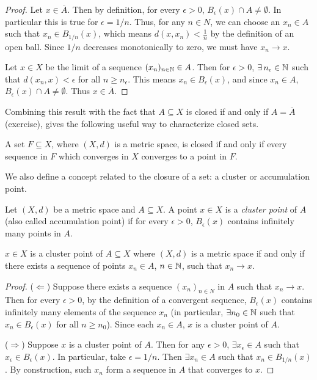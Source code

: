 \documentclass{article}
\begin{document}
\begin{proof}
Let $x \in \overline A$. Then by definition, for every $\epsilon > 0$, $B_\epsilon(x) \cap A \neq \emptyset$. In particular this is true for $\epsilon = 1/n$. Thus, for any $n \in N$, we can choose an $x_n \in A$ such that $x_n \in B_{1/n}(x)$, which means $d(x,x_n) < \frac{1}{n}$ by the definition of an open ball. Since $1/n$ decreases monotonically to zero, we must have $x_n \to x$.

Let $x \in X$ be the limit of a sequence $(x_n)_{n \in {\mathbb{N}}} \in A$. Then for $\epsilon > 0$, $\exists \, n_\epsilon \in {\mathbb{N}}$ such that $d(x_n,x) < \epsilon$ for all $n \geq n_\epsilon$. This means $x_n \in B_\epsilon(x)$, and since $x_n \in A$, $B_\epsilon(x) \cap A \neq \emptyset$. Thus $x \in \overline A$.
\end{proof}

Combining this result with the fact that $A \subseteq X$ is closed if and only if $A = \overline A$ (exercise), gives the following useful way to characterize closed sets. 

\begin{corollary}
\label{cor:closed_converge}
A set $F \subseteq X$, where $(X, d)$ is a metric space, is closed if and only if every sequence in $F$ which converges in $X$ converges to a point in $F$.
\end{corollary}

We also define a concept related to the closure of a set: a cluster or accumulation point.

\begin{definition}
Let $(X,d)$ be a metric space and $A \subseteq X$. A point $x \in X$ is a \emph{cluster point} of $A$ (also called accumulation point) if for every $\epsilon >0$, $B_\epsilon(x)$ contains infinitely many points in $A$.
\end{definition}


\begin{proposition}
\label{prop:cluster_seq}
 $x \in X$ is a cluster point of $A \subseteq X$ where $(X,d)$ is a metric space if and only if there exists a sequence of points $x_n \in A$, $n \in {\mathbb{N}}$, such that $x_n \to x$.
\end{proposition}

\begin{proof}
($\Leftarrow$) Suppose there exists a sequence $(x_n)_{n \in N}$ in $A$ such that $x_n \to x$. Then for every $\epsilon >0$, by the definition of a convergent sequence, $B_\epsilon(x)$ contains infinitely many elements of the sequence $x_n$ (in particular, $\exists n_0 \in {\mathbb{N}}$ such that $x_n \in B_\epsilon(x)$ for all $n \geq n_0$). Since each $x_n \in A$, $x$ is a cluster point of $A$.

($\Rightarrow$) Suppose $x$ is a cluster point of $A$. Then for any $\epsilon > 0$, $\exists x_\epsilon \in A$ such that $x_\epsilon \in B_\epsilon(x)$. In particular, take $\epsilon = 1/n$. Then $\exists x_n \in A$ such that $x_n\in B_{1/n}(x)$. By construction, such $x_n$ form a sequence in $A$ that converges to $x$. 

\end{proof}
\end{document}
